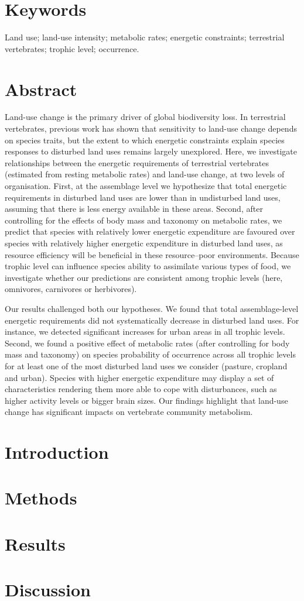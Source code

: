 
\section*{Keywords}
Land use; land-use intensity; metabolic rates; energetic constraints; terrestrial vertebrates; trophic level; occurrence.

\section*{Abstract}
Land-use change is the primary driver of global biodiversity loss. In terrestrial vertebrates, previous work has shown that sensitivity to land-use change depends on species traits, but the extent to which energetic constraints explain species responses to disturbed land uses remains largely unexplored. Here, we investigate relationships between the energetic requirements of terrestrial vertebrates (estimated from resting metabolic rates) and land-use change, at two levels of organisation. First, at the assemblage level we hypothesize that total energetic requirements in disturbed land uses are lower than in undisturbed land uses, assuming that there is less energy available in these areas. Second, after controlling for the effects of body mass and taxonomy on metabolic rates, we predict that species with relatively lower energetic expenditure are favoured over species with relatively higher energetic expenditure in disturbed land uses, as resource efficiency will be beneficial in these resource--poor environments. Because trophic level  can influence species ability to assimilate various types of food, we investigate whether our predictions are consistent among trophic levels (here, omnivores, carnivores or herbivores). 

Our results challenged both our hypotheses. We found that total assemblage-level energetic requirements did not systematically decrease in disturbed land uses. For instance, we detected significant increases for urban areas in all trophic levels. Second, we found a positive effect of metabolic rates (after controlling for body mass and taxonomy) on species probability of occurrence across all trophic levels for at least one of the most disturbed land uses we consider (pasture, cropland and urban). Species with higher energetic expenditure may display a set of characteristics rendering them more able to cope with disturbances, such as higher activity levels or bigger brain sizes. Our findings highlight that land-use change has significant impacts on vertebrate community metabolism. 

\section{Introduction}

\section{Methods}

\section{Results}

\section{Discussion}
